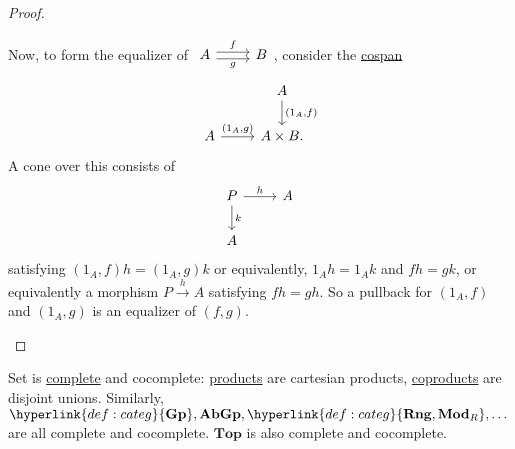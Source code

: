 \documentclass{article}
\newcommand{\named}[1]{\textbf{#1}\index{#1}}
\let\to\longrightarrow
\begin{document}
\begin{proof}
\begin{enumerate}[label=(\roman*)]
    Now, to form the equalizer of $\begin{tikzcd}A \rar[shift left]{f} \rar[shift right,']{g} & B\end{tikzcd}$, consider the \hyperlink{def:span}{cospan}
    \begin{equation*}
      \begin{tikzcd}
        &A \dar{(1_A,f)} \\
        A \rar{(1_A, g)} & A \times B.
      \end{tikzcd}
    \end{equation*}
    A cone over this consists of
    \begin{equation*}
      \begin{tikzcd}
      P \rar{h} \dar{k} & A \\ A
      \end{tikzcd}
    \end{equation*}
    satisfying $(1_A, f) h = (1_A, g) k$ or equivalently, $1_A h = 1_A k$ and $fh = gk$, or equivalently a morphism $P \overset{h}\to A$ satisfying $fh = gh$.
    So a pullback for $(1_A,f)$ and $(1_A, g)$ is an equalizer of $(f,g)$. \qedhere
   \end{enumerate}
\end{proof}
Set is \hyperlink{def:complete}{complete} and cocomplete: \hyperlink{def:lprod}{products} are cartesian products, \hyperlink{def:lcoprod}{coproducts} are disjoint unions.
Similarly, $\hyperlink{def:categ}{\mathbf{Gp}}, \mathbf{AbGp}, \hyperlink{def:categ}{\mathbf{Rng}, \mathbf{Mod}_R}, \dotsc$ are all complete and cocomplete.
$\mathbf{Top}$ is also complete and cocomplete.
\end{document}
